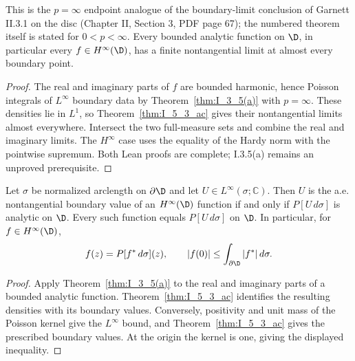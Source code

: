 \begin{corollary}[II.3.1, $p=\infty$: boundary values on the disc]
  \label{cor:II_3_1(p=∞)}
  \leanok
  This is the $p=\infty$ endpoint analogue of the boundary-limit conclusion of
  Garnett II.3.1 on the disc (Chapter II, Section 3, PDF page 67); the numbered
  theorem itself is stated for $0<p<\infty$.
  Every bounded analytic function on $\D$, in particular every $f\in H^\infty(\D)$,
  has a finite nontangential limit at almost every boundary point.
  \begin{proof}
    \leanok
    The real and imaginary parts of $f$ are bounded harmonic, hence Poisson
    integrals of $L^\infty$ boundary data by Theorem~\ref{thm:I_3_5(a)} with
    $p=\infty$. These densities lie in $L^1$, so Theorem~\ref{thm:I_5_3_ac}
    gives their nontangential limits almost everywhere. Intersect the two
    full-measure sets and combine the real and imaginary limits.
    The $H^\infty$ case uses the equality of the Hardy norm with the pointwise supremum.
    Both Lean proofs are complete; I.3.5(a) remains an unproved prerequisite.
  \end{proof}
\end{corollary}

\begin{corollary}[Garnett II.3.2, $p=\infty$: Poisson representation on the disc]
  \label{cor:II_3_2(p=∞)}
  \notready
  Let $\sigma$ be normalized arclength on $\partial\D$ and let
  $U\in L^\infty(\sigma;\mathbb C)$. Then $U$ is the a.e. nontangential
  boundary value of an $H^\infty(\D)$ function if and only if
  $P[U\,d\sigma]$ is analytic on $\D$. Every such function equals
  $P[U\,d\sigma]$ on $\D$. In particular, for $f\in H^\infty(\D)$,
  \[
    f(z)=P[f^*\,d\sigma](z),\qquad
    |f(0)|\le\int_{\partial\D}|f^*|\,d\sigma.
  \]
  \begin{proof}
    \notready
    Apply Theorem~\ref{thm:I_3_5(a)} to the real and imaginary parts of
    a bounded analytic function. Theorem~\ref{thm:I_5_3_ac} identifies the
    resulting densities with its boundary values. Conversely, positivity
    and unit mass of the Poisson kernel give the $L^\infty$ bound, and
    Theorem~\ref{thm:I_5_3_ac} gives the prescribed boundary values.
    At the origin the kernel is one, giving the displayed inequality.
  \end{proof}
\end{corollary}

